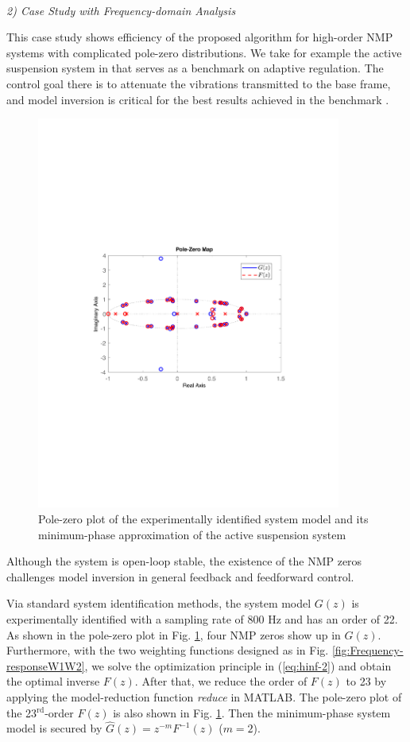 \documentclass [11pt, proquest] {uwthesis}[2020/02/24]
\begin{document}
\

\noindent \emph{2) Case Study with Frequency-domain Analysis}

This case study shows efficiency of the proposed algorithm for high-order
NMP systems with complicated pole-zero distributions. We take for
example the active suspension system in \cite{landau2013active} that
serves as a benchmark on adaptive regulation. The control goal there
is to attenuate the vibrations transmitted to the base frame, and
model inversion is critical for the best results achieved in the benchmark
\cite{chen_selective_2013-1}. 
\begin{figure}
\begin{centering}
\includegraphics[width=10cm]{Model-inversion/pzplot_G_M}
\par\end{centering}
\caption{\label{fig:Frequency-response-of_Hinf-1}Pole-zero plot of the experimentally
identified system model and its minimum-phase approximation of the
active suspension system}
\end{figure}
Although the system is open-loop stable, the existence of the NMP
zeros challenges model inversion in general feedback and feedforward
control.

Via standard system identification methods, the system model $G(z)$
is experimentally identified with a sampling rate of 800 Hz and has
an order of 22. As shown in the pole-zero plot in Fig. \ref{fig:Frequency-response-of_Hinf-1},
four NMP zeros show up in $G(z)$. Furthermore, with the two weighting
functions designed as in Fig. \ref{fig:Frequency-responseW1W2}, we
solve the optimization principle in (\ref{eq:hinf-2}) and obtain
the optimal inverse $F(z)$. After that, we reduce the order of $F(z)$
to 23 by applying the model-reduction function \emph{reduce }in MATLAB.
The pole-zero plot of the 23$^{\text{rd}}$-order $F(z)$ is also
shown in Fig. \ref{fig:Frequency-response-of_Hinf-1}. Then the minimum-phase
system model is secured by $\hat{G}(z)=z^{-m}F^{-1}(z)$ ($m=2$).
\end{document}
